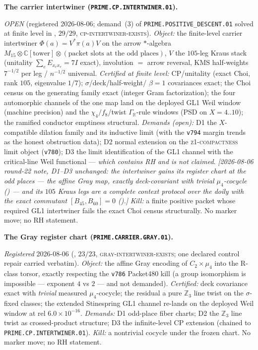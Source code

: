 \documentclass[11pt,a4paper]{article}
\newcommand{\Z}{\mathbb Z}
\begin{document}
\par\smallskip\noindent\textbf{The carrier intertwiner
(\texttt{PRIME.CP.INTERTWINER.01}).}
{\sloppy
\emph{OPEN} (registered 2026-08-06; demand~(3) of
\texttt{PRIME.POSITIVE\_DESCENT.01} solved at finite level in
, $29/29$,
\textsc{cp-intertwiner-exists}).  \emph{Object:} the finite-level
carrier intertwiner $\Phi(a)=V^{*}\pi(a)V$ on the arrow
$*$-algebra $M_{15}\otimes\mathbb C[\text{tower}]\otimes
(\text{packet slots at the odd places})$, $V$ the $105$-leg Kraus
stack (unitality $\sum_eE_{x_ex_e}=7I$ exact), involution $=$
arrow reversal, KMS half-weights $7^{-1/2}$ per leg / $n^{-1/2}$
universal.  \emph{Certified at finite level:} CP/unitality (exact
Choi, rank $105$, eigenvalue $1/7$); $\sigma$/deck/half-weight/
$\beta=1$ covariances exact; the Choi census on the generating
family exact (integer Gram factorization); the four automorphic
channels of the one map land on the deployed GL1 Weil window
(machine precision) and the $\chi_4/f_8$/twist
$\Gamma_{\mathbb R}$-rule windows (PSD on $X=4..10$); the ramified
conductor emptiness structural.  \emph{Demands (open):} D1 the
$X$-compatible dilation family and its inductive limit (with the
\texttt{v794} margin trends as the honest obstruction data); D2
normal extension on the \textsc{z1-compactness} limit object
(\texttt{v780}); D3 the limit identification of the GL1 channel
with the critical-line Weil functional --- \emph{which contains RH
and is not claimed}.  \emph{[2026-08-06 round-22 note, D1--D3
unchanged: the intertwiner gains its register chart at the odd
places --- the affine Gray map, exactly deck-covariant with
trivial $\mu_4$-cocycle
() --- and its $105$ Kraus
legs are a complete context protocol over the doily with the
exact commutant $[B_{45},B_{60}]=0$
().]}  \emph{Kill:} a finite
positive packet whose required GL1 intertwiner fails the exact
Choi census structurally.
No marker move; no RH statement.\par}

\par\smallskip\noindent\textbf{The Gray register chart
(\texttt{PRIME.CARRIER.GRAY.01}).}
{\sloppy
\emph{Registered} 2026-08-06
(, $23/23$,
\textsc{gray-intertwiner-exists}; one declared control repair
carried verbatim).  \emph{Object:} the affine Gray encoding of
$C_2\times\mu_4$ into the R-class torsor, exactly respecting the
\texttt{v786} Packet480 kill (a group isomorphism is impossible
--- exponent $4$ vs $2$ --- and not demanded).  \emph{Certified:}
deck covariance exact with \emph{trivial} measured
$\mu_4$-cocycle; the residual a pure $\Z_3$ line twist on the
$\sigma$-fixed classes; the extended Stinespring GL1 channel
re-lands on the deployed Weil window at rel $6.0\times10^{-16}$.
\emph{Demands:} D1 odd-place fiber charts; D2 the $\Z_3$ line
twist as crossed-product structure; D3 the infinite-level CP
extension (chained to \texttt{PRIME.CP.INTERTWINER.01}).
\emph{Kill:} a nontrivial cocycle under the frozen chart.  No
marker move; no RH statement.\par}
\end{document}
